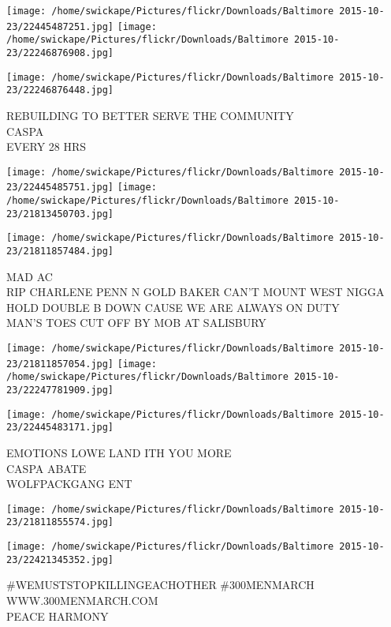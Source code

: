 \documentclass[10pt,letterpaper]{article}
\begin{document}
\texttt{[image: /home/swickape/Pictures/flickr/Downloads/Baltimore 2015-10-23/22445487251.jpg]}
\texttt{[image: /home/swickape/Pictures/flickr/Downloads/Baltimore 2015-10-23/22246876908.jpg]}

\vspace{0.25in}
\texttt{[image: /home/swickape/Pictures/flickr/Downloads/Baltimore 2015-10-23/22246876448.jpg]}

REBUILDING TO BETTER SERVE THE COMMUNITY\\
CASPA\\
EVERY 28 HRS\\
\pagebreak

\texttt{[image: /home/swickape/Pictures/flickr/Downloads/Baltimore 2015-10-23/22445485751.jpg]}
\texttt{[image: /home/swickape/Pictures/flickr/Downloads/Baltimore 2015-10-23/21813450703.jpg]}

\vspace{0.25in}
\texttt{[image: /home/swickape/Pictures/flickr/Downloads/Baltimore 2015-10-23/21811857484.jpg]}

MAD AC\\
RIP CHARLENE PENN N GOLD BAKER CAN'T MOUNT WEST NIGGA HOLD DOUBLE B DOWN CAUSE WE ARE ALWAYS ON DUTY\\
MAN'S TOES CUT OFF BY MOB AT SALISBURY\\
\pagebreak

\texttt{[image: /home/swickape/Pictures/flickr/Downloads/Baltimore 2015-10-23/21811857054.jpg]}
\texttt{[image: /home/swickape/Pictures/flickr/Downloads/Baltimore 2015-10-23/22247781909.jpg]}

\texttt{[image: /home/swickape/Pictures/flickr/Downloads/Baltimore 2015-10-23/22445483171.jpg]}

EMOTIONS LOWE LAND ITH YOU MORE\\
CASPA ABATE\\
WOLFPACKGANG ENT\\
\pagebreak

\texttt{[image: /home/swickape/Pictures/flickr/Downloads/Baltimore 2015-10-23/21811855574.jpg]}

\vspace{0.25in}
\texttt{[image: /home/swickape/Pictures/flickr/Downloads/Baltimore 2015-10-23/22421345352.jpg]}

\#WEMUSTSTOPKILLINGEACHOTHER \#300MENMARCH WWW.300MENMARCH.COM\\
PEACE HARMONY\\
\pagebreak
\end{document}

